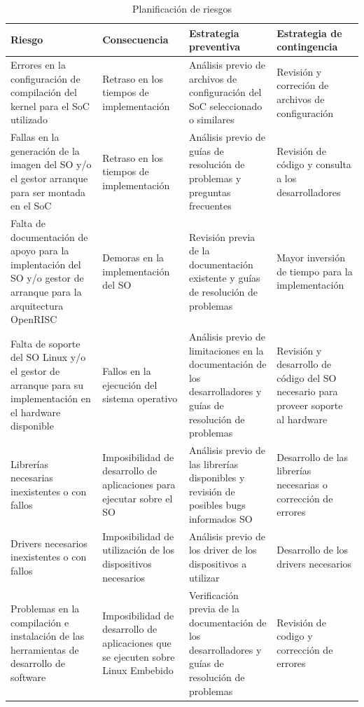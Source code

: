  		\begin{table}[h!]
		\centering
		\begin{tabular}{ p{4cm} p{4cm} p{4cm} p{3cm} }
		\hline 
		\rowcolor[gray]{0.8} Riesgo & Consecuencia & Estrategia preventiva & Estrategia de contingencia\\
		\hline Errores en la configuración de compilación del kernel para el SoC utilizado & 
		       Retraso en los tiempos de implementación & 
		       Análisis previo de archivos de configuración del SoC seleccionado o similares & 
		       Revisión y correción de archivos de configuración\\
		\hline Fallas en la generación de la imagen del SO y/o el gestor arranque para ser montada en el SoC & 
		       Retraso en los tiempos de implementación & 
		       Análisis previo de guías de resolución de problemas y preguntas frecuentes & 
		       Revisión de código y consulta a los desarrolladores\\
		\hline Falta de documentación de apoyo para la implentación del SO y/o gestor de arranque para la arquitectura OpenRISC & 
		       Demoras en la implementación del SO & 
		       Revisión previa de la documentación existente y guías de resolución de problemas & 
		       Mayor inversión de tiempo para la implementación\\
		\hline Falta de soporte del SO Linux y/o el gestor de arranque para su implementación en el hardware disponible & 
			   Fallos en la ejecución del sistema operativo & 
		       Análisis previo de limitaciones en la documentación de los desarrolladores y guías de resolución de problemas & 
		       Revisión y desarrollo de código del SO necesario para proveer soporte al hardware\\
		\hline Librerías necesarias inexistentes o con fallos & 
			   Imposibilidad de desarrollo de aplicaciones para ejecutar sobre el SO &
			   Análisis previo de las librerías disponibles y revisión de posibles bugs informados SO & 
			   Desarrollo de las librerías necesarias o corrección de errores\\
		\hline Drivers necesarios inexistentes o con fallos & 
			   Imposibilidad de utilización de los dispositivos necesarios & 
			   Análisis previo de los driver de los dispositivos a utilizar & 
			   Desarrollo de los drivers necesarios\\		
		\hline Problemas en la compilación e instalación de las herramientas de desarrollo de software & 
			   Imposibilidad de desarrollo de aplicaciones que se ejecuten sobre Linux Embebido & 
			   Verificación previa de la documentación de los desarrolladores y guías de resolución de problemas & 
			   Revisión de codigo y corrección de errores\\
		\hline
		\end{tabular}
		\caption{Planificación de riesgos}
		\end{table}

